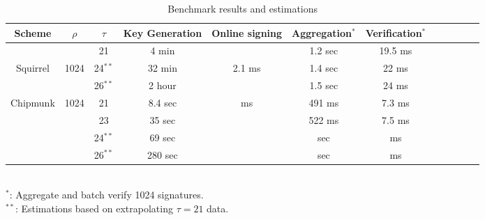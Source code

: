 %  

\begin{table}[t]\centering
    \begin{tabular}{|c|c|c||c|c|c|c|c|c||c|c|c|}\hline
      Scheme &  $\rho$ & $\tau$ &  Key Generation & Online signing &Aggregation$^{*}$ & Verification$^{*}$ \\ \hline\hline

             &          & 21        & 4 min     &     &  1.2 sec &  19.5 ms\\\cline{3-4}\cline{6-7}
    Squirrel &  1024    & 24$^{**}$ & 32  min   & 2.1 ms    &  1.4 sec &  22 ms\\\cline{3-4}\cline{6-7}
             &          & 26$^{**}$ & 2 hour    &     &  1.5 sec &  24 ms \\\hline\hline

    \multirow{4}{*}{Chipmunk} &   \multirow{4}{*}{1024}  & 21        &   8.4 sec    &   \multirow{4}{*}{ms}   &  491 ms &  7.3 ms\\\cline{3-4}\cline{6-7}
             &          & 23        & 35 sec    &     &   522 ms &   7.5 ms\\\cline{3-4}\cline{6-7}
             &          & 24$^{**}$ & 69 sec    &     &   sec &   ms \\\cline{3-4}\cline{6-7}   
             &          & 26$^{**}$ & 280 sec    &     &   sec &   ms \\\hline %

    \end{tabular}\\
    $^{*}$: Aggregate and batch verify 1024 signatures.\\
    $^{**}$: Estimations based on extrapolating $\tau=21$ data.
    \caption{Benchmark results and estimations}
    \label{tab:computational_complexity}
\end{table}